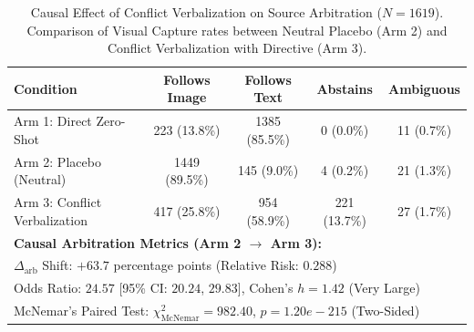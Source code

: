 \begin{table}[t]
\centering
\small
\caption{Causal Effect of Conflict Verbalization on Source Arbitration ($N=1619$). Comparison of Visual Capture rates between Neutral Placebo (Arm 2) and Conflict Verbalization with Directive (Arm 3).}
\label{tab:source_arbitration_contingency}
\begin{tabular}{lcccc}
\hline
\textbf{Condition} & \textbf{Follows Image} & \textbf{Follows Text} & \textbf{Abstains} & \textbf{Ambiguous} \\
\hline
Arm 1: Direct Zero-Shot & 223 (13.8\%) & 1385 (85.5\%) & 0 (0.0\%) & 11 (0.7\%) \\
Arm 2: Placebo (Neutral) & 1449 (89.5\%) & 145 (9.0\%) & 4 (0.2\%) & 21 (1.3\%) \\
Arm 3: Conflict Verbalization & 417 (25.8\%) & 954 (58.9\%) & 221 (13.7\%) & 27 (1.7\%) \\
\hline
\multicolumn{5}{l}{\textbf{Causal Arbitration Metrics (Arm 2 $\rightarrow$ Arm 3):}} \\
\multicolumn{5}{l}{$\Delta_{\text{arb}}$ Shift: $+63.7$ percentage points (Relative Risk: $0.288$)} \\
\multicolumn{5}{l}{Odds Ratio: $24.57$ [95\% CI: $20.24$, $29.83$], Cohen's $h = 1.42$ (Very Large)} \\
\multicolumn{5}{l}{McNemar's Paired Test: $\chi^2_{\text{McNemar}} = 982.40$, $p = 1.20e-215$ (Two-Sided)} \\
\hline
\end{tabular}
\end{table}
